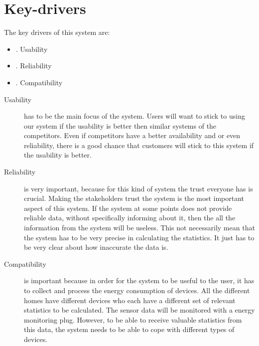 \section{Key-drivers}
The key drivers of this system are:
\begin{itemize}
	\item {}. Usability
	\item {}. Reliability
	\item {}. Compatibility
\end{itemize}


\begin{description}

\item [Usability] has to be the main focus of the system. Users will want to stick to using our system if the usability is better then similar systems of the competitors. Even if competitors have a better availability and or even reliability, there is a good chance that customers will stick to this system if the usability is better. 

\item [Reliability] is very important, because for this kind of system the trust everyone has is crucial. Making the stakeholders trust the system is the most important aspect of this system. If the system at some points does not provide reliable data, without specifically informing about it, then the all the information from the system will be useless.
This not necessarily mean that the system has to be very precise in calculating the statistics. It just has to be very clear about how inaccurate the data is.

\item [Compatibility] is important because in order for the system to be useful to the user, it has to collect and process the energy consumption of devices. All the different homes have different devices who each have a different set of relevant statistics to be calculated.
The sensor data will be monitored with a energy monitoring plug. However, to be able to receive valuable statistics from this data, the system needs to be able to cope with different types of devices.
%

\end{description}